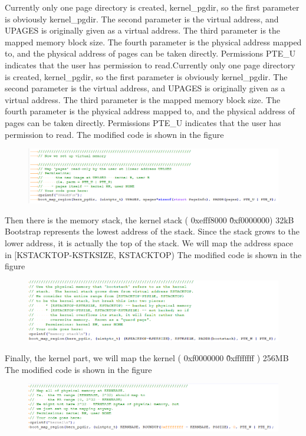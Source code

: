 Currently only one page directory is created, kernel\_pgdir, so the first parameter is obviously kernel\_pgdir. The second parameter is the virtual address, and UPAGES is originally given as a virtual address. The third parameter is the mapped memory block size. The fourth parameter is the physical address mapped to, and the physical address of pages can be taken directly. Permissions PTE\_U indicates that the user has permission to read.Currently only one page directory is created, kernel\_pgdir, so the first parameter is obviously kernel\_pgdir. The second parameter is the virtual address, and UPAGES is originally given as a virtual address. The third parameter is the mapped memory block size. The fourth parameter is the physical address mapped to, and the physical address of pages can be taken directly. Permissions PTE\_U indicates that the user has permission to read.
The modified code is shown in the figure
\begin{figure}[H]
\centering
\includegraphics[width=0.8\linewidth]{figure/mem_init_changed1}
\end{figure}


Then there is the memory stack, the kernel stack ( 0xefff8000 \~ 0xf0000000) 32kB
Bootstrap represents the lowest address of the stack. Since the stack grows to the lower address, it is actually the top of the stack. We will map the address space in [KSTACKTOP-KSTKSIZE, KSTACKTOP)
The modified code is shown in the figure
\begin{figure}[H]
\centering
\includegraphics[width=0.8\linewidth]{figure/mem_init_changed2}
\end{figure}


Finally, the kernel part, we will map the kernel ( 0xf0000000 \~ 0xffffffff ) 256MB
The modified code is shown in the figure
\begin{figure}[H]
\centering
\includegraphics[width=0.8\linewidth]{figure/mem_init_changed3}
\end{figure}

